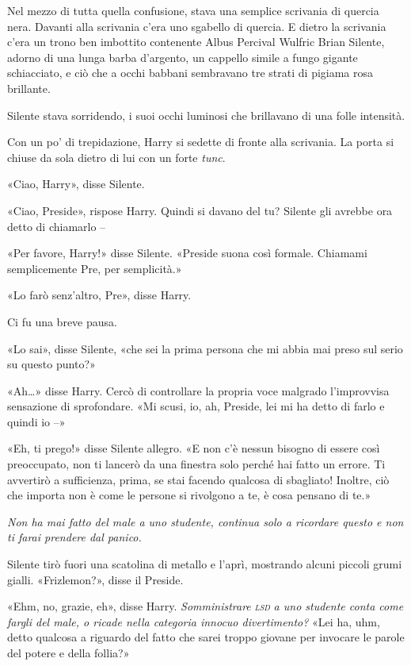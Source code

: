Nel mezzo di tutta quella confusione, stava una semplice scrivania di quercia nera. Davanti alla scrivania c’era uno sgabello di quercia. E dietro la scrivania c’era un trono ben imbottito contenente Albus Percival Wulfric Brian Silente, adorno di una lunga barba d’argento, un cappello simile a fungo gigante schiacciato, e ciò che a occhi babbani sembravano tre strati di pigiama rosa brillante.

Silente stava sorridendo, i suoi occhi luminosi che brillavano di una folle intensità.

Con un po’ di trepidazione, Harry si sedette di fronte alla scrivania. La porta si chiuse da sola dietro di lui con un forte \textit{tunc}.

«Ciao, Harry», disse Silente.

«Ciao, Preside», rispose Harry. Quindi si davano del tu? Silente gli avrebbe ora detto di chiamarlo –

«Per favore, Harry!» disse Silente. «Preside suona così formale. Chiamami semplicemente Pre, per semplicità.»

«Lo farò senz’altro, Pre», disse Harry.

Ci fu una breve pausa.

«Lo sai», disse Silente, «che sei la prima persona che mi abbia mai preso sul serio su questo punto?»

«Ah…» disse Harry. Cercò di controllare la propria voce malgrado l’improvvisa sensazione di sprofondare. «Mi scusi, io, ah, Preside, lei mi ha detto di farlo e quindi io –»

«Eh, ti prego!» disse Silente allegro. «E non c’è nessun bisogno di essere così preoccupato, non ti lancerò da una finestra solo perché hai fatto un errore. Ti avvertirò a sufficienza, prima, se stai facendo qualcosa di sbagliato! Inoltre, ciò che importa non è come le persone si rivolgono a te, è cosa pensano di te.»

\textit{Non ha mai fatto del male a uno studente, continua solo a ricordare questo e non ti farai prendere dal panico.}

Silente tirò fuori una scatolina di metallo e l’aprì, mostrando alcuni piccoli grumi gialli. «Frizlemon?», disse il Preside.

«Ehm, no, grazie, eh», disse Harry. \textit{Somministrare} \textsl{\textsc{lsd}} \textit{a uno studente conta come fargli del male, o ricade nella categoria innocuo divertimento?} «Lei ha, uhm, detto qualcosa a riguardo del fatto che sarei troppo giovane per invocare le parole del potere e della follia?»


